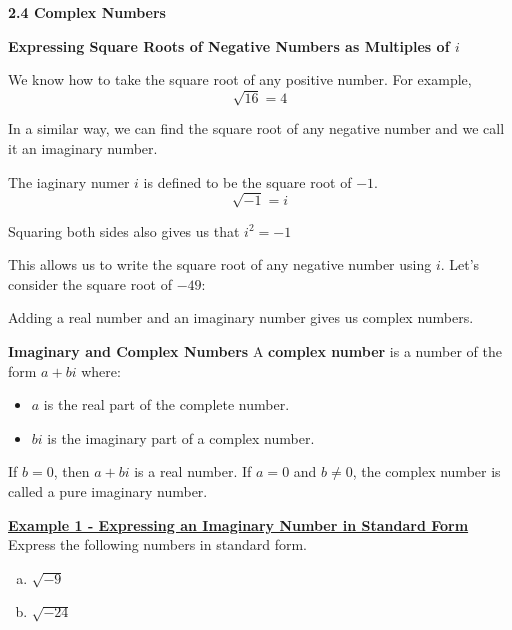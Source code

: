 \documentclass[12pt]{book}
\begin{document}
\textbf{{\Large 2.4 Complex Numbers}}
\vspace{5mm}


{\large \textbf{Expressing Square Roots of Negative Numbers as Multiples of $i$}}
\vspace{3mm}

We know how to take the square root of any positive number. For example, $$ \sqrt{16} = 4$$

In a similar way, we can find the square root of any negative number and we call it an imaginary number.


\begin{boxR}
    The iaginary numer $i$ is defined to be the square root of $-1$.
    $$ \sqrt{-1}= i$$

Squaring both sides also gives us that $i^2 = -1$
\end{boxR}

This allows us to write the square root of any negative number using $i$. Let's consider the square root of $-49$:

\vspace{25mm}

Adding a real number and an imaginary number gives us complex numbers.
\vspace{3mm}

\begin{boxR}
\textbf{Imaginary and Complex Numbers}
    \vspace{1mm}
    \hline
    \vspace{2mm}
    A \textbf{complex number} is a number of the form $a + bi$ where: 
   \begin{itemize}
        \item $a$ is the real part of the complete number.
        \item $bi$ is the imaginary part of a complex number. 
    \end{itemize}
    \vspace{1mm}
    If $b=0$, then $a+bi$ is a real number. If $a=0$ and $b \neq 0$, the complex number is called a pure imaginary number. 
\end{boxR}

\newpage
\underline{\textbf{Example 1 - Expressing an Imaginary Number in Standard Form}}
Express the following numbers in standard form. 

\begin{enumerate}[(a)]
    \item $\sqrt{-9}$ 
    \vspace{30mm}
    \item $\sqrt{-24}$
     \vspace{30mm}
\end{enumerate}
\end{document}

